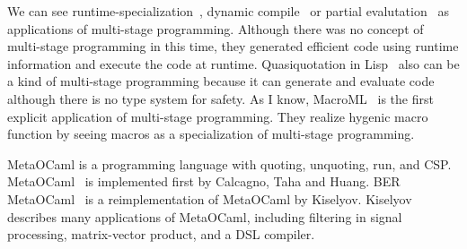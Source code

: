 

We can see runtime-specialization~\cite{ConselNoel1996Runtime},
dynamic compile~\cite{AuslanderPhiliposeChambersEggersBershad1996DynamicCompilation, EnglerHsiehKaashoek1996TickC, PolettoHsiehEnglerKaashoek1999CandTcc, GrantPhiliposeMockChambersEggers1999DyC} or
partial evalutation~\cite{JonesGomardSestoft1993partial} as applications of
multi-stage programming. Although there was no concept of multi-stage
programming in this time, they generated efficient code using runtime
information and execute the code at runtime. Quasiquotation in
Lisp~\cite{Bawden1999Lisp} also can be a kind of multi-stage programming
because it can generate and evaluate code although there is no type system for
safety. As I know, MacroML~\cite{GanzAmrTaha2001MacroML} is the first explicit
application of multi-stage programming. They realize hygenic macro function by
seeing macros as a specialization of multi-stage programming.


MetaOCaml is a programming language with quoting, unquoting, run, and CSP.
MetaOCaml~\cite{CalcagnoTahaHuangLeroy2003Implementing, Taha2007Gentle} is implemented
first by Calcagno, Taha and Huang. BER
MetaOCaml~\cite{Kiselyov2014BERMetaOCamlBER} is a reimplementation of MetaOCaml
by Kiselyov. Kiselyov~\cite{Kiselyov2018Reconcilong} describes many
applications of MetaOCaml, including filtering in signal processing,
matrix-vector product, and a DSL compiler.


